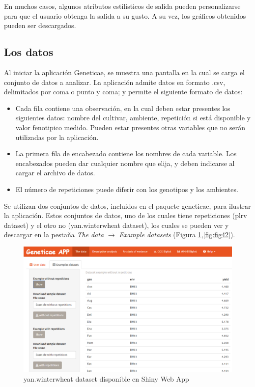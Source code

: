 En muchos casos, algunos atributos estilísticos de salida pueden personalizarse para que el usuario obtenga la salida a su gusto. A su vez, los gráficos obtenidos pueden ser descargados.


\subsection{Los datos}
Al iniciar la aplicación Geneticae, se muestra una pantalla en la cual se carga el conjunto de datos a analizar. La aplicación admite datos en formato .csv, delimitados por coma o punto y coma; y permite el siguiente formato de datos: 
\begin{itemize}[wide, nosep, labelindent = 0pt, topsep = 1ex]
\item Cada fila contiene una observación, en la cual deben estar presentes los siguientes datos: nombre del cultivar, ambiente, repetición si está disponible y valor fenotipico medido. Pueden estar presentes otras variables que no serán utilizadas por la aplicación.
\item La primera fila de encabezado contiene los nombres de cada variable. Los encabezados pueden dar cualquier nombre que elija, y deben indicarse al cargar el archivo de datos.
\item El número de repeticiones puede diferir con los genotipos y los ambientes.
\end{itemize}

Se utilizan dos conjuntos de datos, incluidos en el paquete geneticae, para ilustrar la aplicación. Estos conjuntos de datos, uno de los cuales tiene repeticiones (plrv dataset) y el otro no (yan.winterwheat dataset), los cuales se pueden ver y descargar en la pestaña \emph{The data} $\rightarrow$ \emph{Example datasets} (Figura \ref{fig:fig41},\ref{fig:fig42}). 

\begin{figure}[H]
	\begin{center}
		\includegraphics[width=16cm]{./Graficos/Exampledatasets_withoutrep.png}
	\end{center}
	\caption{yan.winterwheat dataset disponible en Shiny Web App}
	\label{fig:fig41}
\end{figure}


